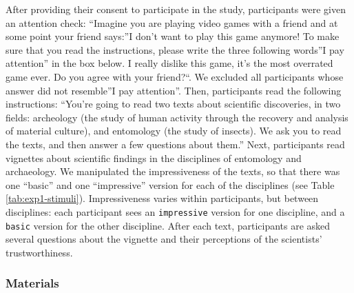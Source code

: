 \documentclass[
  doc,floatsintext]{apa6}
\begin{document}
After providing their consent to participate in the study, participants were given an attention check: ``Imagine you are playing video games with a friend and at some point your friend says:''I don't want to play this game anymore! To make sure that you read the instructions, please write the three following words''I pay attention'' in the box below. I really dislike this game, it's the most overrated game ever. Do you agree with your friend?``. We excluded all participants whose answer did not resemble''I pay attention''. Then, participants read the following instructions: ``You're going to read two texts about scientific discoveries, in two fields: archeology (the study of human activity through the recovery and analysis of material culture), and entomology (the study of insects). We ask you to read the texts, and then answer a few questions about them.'' Next, participants read vignettes about scientific findings in the disciplines of entomology and archaeology. We manipulated the impressiveness of the texts, so that there was one ``basic'' and one ``impressive'' version for each of the disciplines (see Table \ref{tab:exp1-stimuli}). Impressiveness varies within participants, but between disciplines: each participant sees an \texttt{impressive} version for one discipline, and a \texttt{basic} version for the other discipline. After each text, participants are asked several questions about the vignette and their perceptions of the scientists' trustworthiness.

\subsubsection{Materials}\label{materials}
\end{document}
